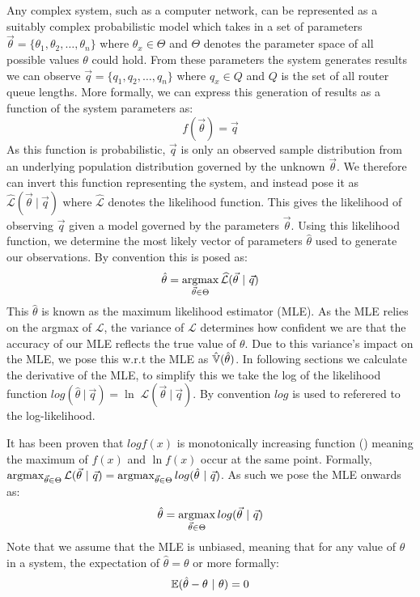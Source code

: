 Any complex system, such as a computer network, can be represented as a suitably complex probabilistic model which takes in a set of parameters $\vec{\theta} = \{\theta_1, \theta_2,\ldots,\theta_n\}$ where $\theta_x \in \Theta$ and $\Theta$ denotes the parameter space of all possible values $\theta$ could hold. From these parameters the system generates results we can observe $\vec{q} = \{q_1,q_2,\ldots,q_n\}$ where $q_x \in Q$ and $Q$ is the set of all router queue lengths. More formally, we can express this generation of results as a function of the system parameters as:
\begin{equation*}
    f(\vec{\theta}) = \vec{q}
\end{equation*}
As this function is probabilistic, $\vec{q}$ is only an observed sample distribution from an underlying population distribution governed by the unknown $\vec{\theta}$. We therefore can invert this function representing the system, and instead pose it as $\widehat{\mathcal{L}}(\vec{\theta}\ |\ \vec{q})$ where $\widehat{\mathcal{L}}$ denotes the likelihood function. This gives the likelihood of observing $\vec{q}$ given a model governed by the parameters $\vec{\theta}$. Using this likelihood function, we determine the most likely vector of parameters $\hat\theta$ used to generate our observations. By convention this is posed as:
\begin{equation*}
    \hat\theta = \operatorname*{argmax}_{\vec{\theta} \in \Theta} \widehat{\mathcal{L}}(\vec{\theta}\ |\ \vec{q})
\end{equation*}
This $\hat\theta$ is known as the maximum likelihood estimator (MLE). As the MLE relies on the argmax of $\mathcal{L}$, the variance of $\mathcal{L}$ determines how confident we are that the accuracy of our MLE reflects the true value of $\theta$. Due to this variance's impact on the MLE, we pose this w.r.t the MLE as $\operatorname{\hat{\mathbb{V}}}(\hat\theta)$. In following sections we calculate the derivative of the MLE, to simplify this we take the log of the likelihood function $log(\hat\theta\ |\ \vec{q})=\ln\;\mathcal{L}(\vec{\theta}\ |\ \vec{q})$. By convention $log$ is used to referered to the log-likelihood.\par
It has been proven that $log f(x)$ is monotonically increasing function (\cite{binmore_mathematical_1977}) meaning the maximum of $f(x)$ and $\ln f(x)$ occur at the same point. Formally, $\operatorname*{argmax}_{\vec{\theta} \in \Theta} \mathcal{L}(\vec{\theta}\ |\ \vec{q})= \operatorname*{argmax}_{\vec{\theta} \in \Theta} log(\hat\theta\ |\ \vec{q})$. As such we pose the MLE onwards as:
\begin{equation*}
    \hat\theta = \operatorname*{argmax}_{\vec{\theta} \in \Theta} log(\vec{\theta}\ |\ \vec{q})
\end{equation*}
Note that we assume that the MLE is unbiased, meaning that for any value of $\theta$ in a system, the expectation of $\hat\theta=\theta$ or more formally:
\begin{equation*}
    \operatorname{\mathbb{E}}(\hat\theta - \theta\ |\ \theta) = 0
\end{equation*}


